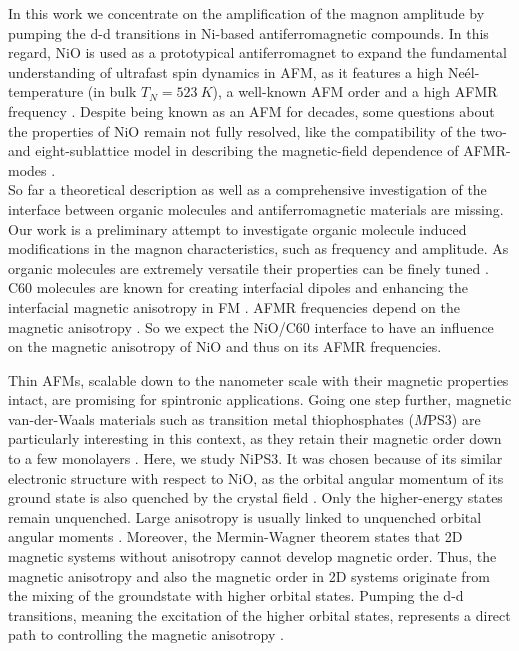 In this work we concentrate on the amplification of the magnon amplitude by pumping the d-d transitions in Ni-based antiferromagnetic compounds.
In this regard, NiO is used as a prototypical antiferromagnet to expand the fundamental understanding of ultrafast spin dynamics in AFM, as it features a high Neél-temperature (in bulk $T_N=\qty{523}{K}$), a well-known AFM order and a high AFMR frequency .
Despite being known as an AFM for decades, some questions about the properties of NiO remain not fully resolved, like the compatibility of the two- and eight-sublattice model in describing the magnetic-field dependence of AFMR-modes \cite{ohmichi_frequency-domain_2022}. \\
So far a theoretical description as well as a comprehensive investigation of the interface between organic molecules and antiferromagnetic materials are missing.
Our work is a preliminary attempt to investigate organic molecule induced modifications in the magnon characteristics, such as frequency and amplitude.
As organic molecules are extremely versatile their properties can be finely tuned \cite{sanvito_molecular_2011}.
C60 molecules are known for creating interfacial dipoles  and enhancing the interfacial magnetic anisotropy in FM .
AFMR frequencies depend on the magnetic anisotropy .
So we expect the NiO/C60 interface to have an influence on the magnetic anisotropy of NiO and thus on its AFMR frequencies.

Thin AFMs, scalable down to the nanometer scale with their magnetic properties intact, are promising for spintronic applications.
Going one step further, magnetic van-der-Waals materials such as transition metal thiophosphates ($M$PS3) are particularly interesting in this context, as they retain their magnetic order down to a few monolayers .
Here, we study NiPS3.
It was chosen because of its similar electronic structure with respect to NiO, as the orbital angular momentum of its ground state is also quenched by the crystal field .
Only the higher-energy states remain unquenched.
Large anisotropy is usually linked to unquenched orbital angular moments .
Moreover, the Mermin-Wagner theorem states that 2D magnetic systems without anisotropy cannot develop magnetic order.
Thus, the magnetic anisotropy and also the magnetic order in 2D systems originate from the mixing of the groundstate with higher orbital states.
Pumping the d-d transitions, meaning the excitation of the higher orbital states, represents a direct path to controlling the magnetic anisotropy \cite{afanasiev_controlling_2021}.


